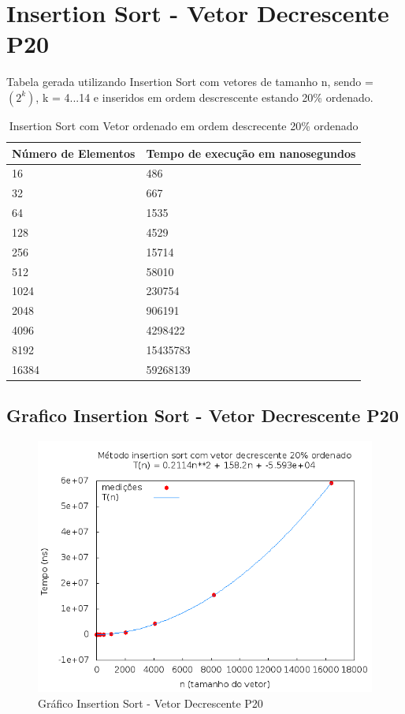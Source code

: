 \documentclass[12pt,a4paper,twoside]{report}
\begin{document}
\section{Insertion Sort - Vetor Decrescente P20}
Tabela gerada utilizando Insertion Sort com vetores de tamanho n, sendo = $(2^k)$, k = 4...14 e inseridos em ordem descrescente estando 20\% ordenado.

\begin{table}[H]
\centering
\caption{Insertion Sort com Vetor ordenado em ordem descrecente 20\% ordenado}
\label{my-label}
\begin{tabular}{|l|l|}
\hline
\multicolumn{1}{|c|}{\textbf{Número de Elementos}} & \multicolumn{1}{c|}{\textbf{Tempo de execução em nanosegundos}} \\ \hline
16 & 486 \\ \hline
32 & 667 \\ \hline
64 & 1535 \\ \hline
128 & 4529 \\ \hline
256 & 15714 \\ \hline
512 & 58010 \\ \hline
1024 & 230754 \\ \hline
2048 & 906191 \\ \hline
4096 & 4298422 \\ \hline
8192 & 15435783 \\ \hline
16384 & 59268139 \\ \hline
\end{tabular}
\end{table}

\subsection{Grafico Insertion Sort - Vetor Decrescente P20}
\begin{figure}[H]
    \centering
    \includegraphics[width=0.7\linewidth]{graficos/Insertion/vIntDecrescenteP20/vIntDecrescenteP20.png}
  \caption{Gráfico Insertion Sort - Vetor Decrescente P20}
\end{figure}
\end{document}
